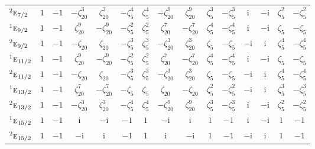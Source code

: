 \documentclass[10pt,a4paper]{article}
\numberwithin{equation}{section}
\newcommand{\irr}[1]{\text{\normalfont\scshape #1}}
\newcommand{\conjpair}[1]{{}^{#1}}
\newcommand{\iunit}{\mathrm{i}}
\newcommand{\rootunity}[1]{\zeta_{#1}}
\begin{document}
{\begin{longtable}{@{}lcccccccccccccc@{}}
$\conjpair{2}\irr{e}_{7/2}$ & $1$ & $-1$ & $-\rootunity{20}^{3}$ & $\rootunity{20}^{3}$ & $-\rootunity{5}^{4}$ & $\rootunity{5}^{4}$ & $-\rootunity{20}^{9}$ & $\rootunity{20}^{9}$ & $\rootunity{5}^{3}$ & $-\rootunity{5}^{3}$ & $\iunit{}$ & $-\iunit{}$ & $\rootunity{5}^{2}$ & $-\rootunity{5}^{2}$\\
$\conjpair{1}\irr{e}_{9/2}$ & $1$ & $-1$ & $\rootunity{20}^{9}$ & $-\rootunity{20}^{9}$ & $-\rootunity{5}^{2}$ & $\rootunity{5}^{2}$ & $\rootunity{20}^{7}$ & $-\rootunity{20}^{7}$ & $\rootunity{5}^{4}$ & $-\rootunity{5}^{4}$ & $\iunit{}$ & $-\iunit{}$ & $\rootunity{5}$ & $-\rootunity{5}$\\
$\conjpair{2}\irr{e}_{9/2}$ & $1$ & $-1$ & $-\rootunity{20}$ & $\rootunity{20}$ & $-\rootunity{5}^{3}$ & $\rootunity{5}^{3}$ & $-\rootunity{20}^{3}$ & $\rootunity{20}^{3}$ & $\rootunity{5}$ & $-\rootunity{5}$ & $-\iunit{}$ & $\iunit{}$ & $\rootunity{5}^{4}$ & $-\rootunity{5}^{4}$\\
$\conjpair{1}\irr{e}_{11/2}$ & $1$ & $-1$ & $\rootunity{20}^{9}$ & $-\rootunity{20}^{9}$ & $-\rootunity{5}^{2}$ & $\rootunity{5}^{2}$ & $\rootunity{20}^{7}$ & $-\rootunity{20}^{7}$ & $\rootunity{5}^{4}$ & $-\rootunity{5}^{4}$ & $\iunit{}$ & $-\iunit{}$ & $\rootunity{5}$ & $-\rootunity{5}$\\
$\conjpair{2}\irr{e}_{11/2}$ & $1$ & $-1$ & $-\rootunity{20}$ & $\rootunity{20}$ & $-\rootunity{5}^{3}$ & $\rootunity{5}^{3}$ & $-\rootunity{20}^{3}$ & $\rootunity{20}^{3}$ & $\rootunity{5}$ & $-\rootunity{5}$ & $-\iunit{}$ & $\iunit{}$ & $\rootunity{5}^{4}$ & $-\rootunity{5}^{4}$\\
$\conjpair{1}\irr{e}_{13/2}$ & $1$ & $-1$ & $\rootunity{20}^{7}$ & $-\rootunity{20}^{7}$ & $-\rootunity{5}$ & $\rootunity{5}$ & $\rootunity{20}$ & $-\rootunity{20}$ & $\rootunity{5}^{2}$ & $-\rootunity{5}^{2}$ & $-\iunit{}$ & $\iunit{}$ & $\rootunity{5}^{3}$ & $-\rootunity{5}^{3}$\\
$\conjpair{2}\irr{e}_{13/2}$ & $1$ & $-1$ & $-\rootunity{20}^{3}$ & $\rootunity{20}^{3}$ & $-\rootunity{5}^{4}$ & $\rootunity{5}^{4}$ & $-\rootunity{20}^{9}$ & $\rootunity{20}^{9}$ & $\rootunity{5}^{3}$ & $-\rootunity{5}^{3}$ & $\iunit{}$ & $-\iunit{}$ & $\rootunity{5}^{2}$ & $-\rootunity{5}^{2}$\\
$\conjpair{1}\irr{e}_{15/2}$ & $1$ & $-1$ & $\iunit{}$ & $-\iunit{}$ & $-1$ & $1$ & $-\iunit{}$ & $\iunit{}$ & $1$ & $-1$ & $\iunit{}$ & $-\iunit{}$ & $1$ & $-1$\\
$\conjpair{2}\irr{e}_{15/2}$ & $1$ & $-1$ & $-\iunit{}$ & $\iunit{}$ & $-1$ & $1$ & $\iunit{}$ & $-\iunit{}$ & $1$ & $-1$ & $-\iunit{}$ & $\iunit{}$ & $1$ & $-1$\\

\end{longtable}}
\end{document}
